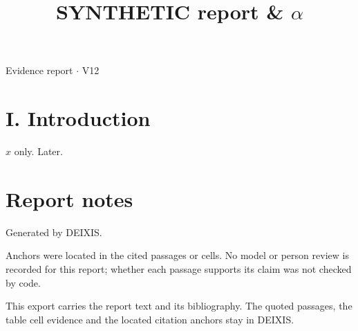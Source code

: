 \documentclass[journal]{IEEEtran}
\begin{document}
\title{SYNTHETIC report \& \ensuremath{\alpha}}

\maketitle

\noindent Evidence report \ensuremath{\cdot} V12

\section*{I. Introduction}

$x$ only. \cite{Synth26} Later. \cite{Synth26}

\section*{Report notes}

Generated by DEIXIS.

Anchors were located in the cited passages or cells. No model or person review is recorded for this report; whether each passage supports its claim was not checked by code.

This export carries the report text and its bibliography. The quoted passages, the table cell evidence and the located citation anchors stay in DEIXIS.




\end{document}
